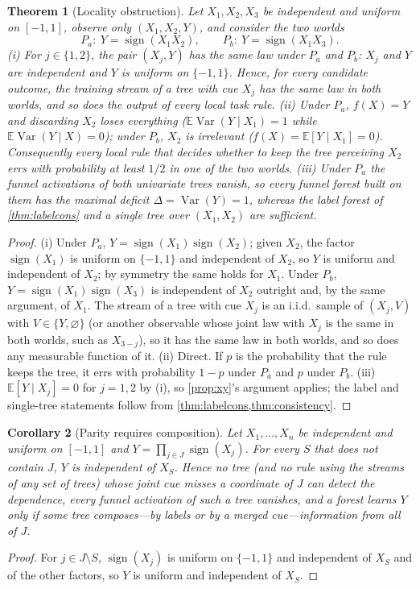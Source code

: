 \documentclass[11pt]{article}
\newtheorem{theorem}{Theorem}
\newtheorem{corollary}[theorem]{Corollary}
\theoremstyle{definition}
\theoremstyle{remark}
\newcommand{\E}{\mathbb{E}}
\newcommand{\Var}{\operatorname{Var}}
\begin{document}
\begin{theorem}[Locality obstruction]\label{thm:locality}
Let $X_1,X_2,X_3$ be independent and uniform on $[-1,1]$, observe only $(X_1,X_2,Y)$,
and consider the two worlds
\[
  P_a:\ Y=\operatorname{sign}(X_1X_2),\qquad P_b:\ Y=\operatorname{sign}(X_1X_3).
\]
(i) For $j\in\{1,2\}$, the pair $(X_j,Y)$ has the same law under $P_a$ and $P_b$: $X_j$
and $Y$ are independent and $Y$ is uniform on $\{-1,1\}$.  Hence, for every candidate
outcome, the training stream of a tree with cue $X_j$ has the same law in both worlds,
and so does the output of every local task rule.  (ii) Under $P_a$, $f(X)=Y$ and
discarding $X_2$ loses everything ($\E\Var(Y\mid X_1)=1$ while $\E\Var(Y\mid X)=0$);
under $P_b$, $X_2$ is irrelevant ($f(X)=\E[Y\mid X_1]=0$).  Consequently every local
rule that decides whether to keep the tree perceiving $X_2$ errs with probability at
least $1/2$ in one of the two worlds.  (iii) Under $P_a$ the funnel activations of both
univariate trees vanish, so every funnel forest built on them has the maximal deficit
$\Delta=\Var(Y)=1$, whereas the label forest of \cref{thm:labelcons} and a single tree
over $(X_1,X_2)$ are sufficient.
\end{theorem}
\begin{proof}
(i) Under $P_a$, $Y=\operatorname{sign}(X_1)\operatorname{sign}(X_2)$; given $X_2$, the
factor $\operatorname{sign}(X_1)$ is uniform on $\{-1,1\}$ and independent of $X_2$, so
$Y$ is uniform and independent of $X_2$; by symmetry the same holds for $X_1$.  Under
$P_b$, $Y=\operatorname{sign}(X_1)\operatorname{sign}(X_3)$ is independent of $X_2$
outright and, by the same argument, of $X_1$.  The stream of a tree with cue $X_j$ is an
i.i.d.\ sample of $(X_j,V)$ with $V\in\{Y,\varnothing\}$ (or another observable whose
joint law with $X_j$ is the same in both worlds, such as $X_{3-j}$), so it has the same
law in both worlds, and so does any measurable function of it.  (ii) Direct.  If $p$ is
the probability that the rule keeps the tree, it errs with probability $1-p$ under
$P_a$ and $p$ under $P_b$.  (iii) $\E[Y\mid X_j]=0$ for $j=1,2$ by (i), so
\cref{prop:xy}'s argument applies; the label and single-tree statements follow from
\cref{thm:labelcons,thm:consistency}.
\end{proof}

\begin{corollary}[Parity requires composition]\label{cor:parity}
Let $X_1,\dots,X_n$ be independent and uniform on $[-1,1]$ and
$Y=\prod_{j\in J}\operatorname{sign}(X_j)$.  For every $S$ that does not contain $J$,
$Y$ is independent of $X_S$.  Hence no tree (and no rule using the streams of any set of
trees) whose joint cue misses a coordinate of $J$ can detect the dependence, every
funnel activation of such a tree vanishes, and a forest learns $Y$ only if some tree
composes---by labels or by a merged cue---information from all of $J$.
\end{corollary}
\begin{proof}
For $j\in J\setminus S$, $\operatorname{sign}(X_j)$ is uniform on $\{-1,1\}$ and
independent of $X_S$ and of the other factors, so $Y$ is uniform and independent of $X_S$.
\end{proof}
\end{document}
